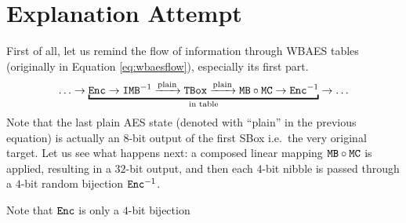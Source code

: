 \section{Explanation Attempt}
\label{sec:attempt}

First of all, let us remind the flow of information through WBAES tables (originally in Equation \ref{eq:wbaesflow}), especially its first part.
\begin{equation}
\label{eq:wbaesfirst}
	\ldots \rarr \underbracket{\Enc \rarr \IMB^{-1} \xrightarrow{\textnormal{plain}} \TBox \xrightarrow{\textnormal{plain}} \MB \circ \MC \rarr \Enc^{-1}}_{\textnormal{in table}} \rarr \ldots
\end{equation}
Note that the last plain AES state (denoted with ``plain'' in the previous equation) is actually an $8$-bit output of the first SBox i.e.\ the very original target. Let us see what happens next: a composed linear mapping $\texttt{MB}\circ\texttt{MC}$ is applied, resulting in a $32$-bit output, and then each $4$-bit nibble is passed through a $4$-bit random bijection $\texttt{Enc}^{-1}$. 

Note that $\texttt{Enc}$ is only a $4$-bit bijection 



